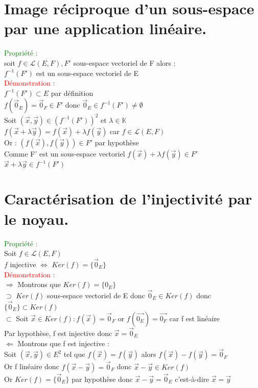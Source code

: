 \documentclass{article}
\begin{document}
\section{Image réciproque d'un sous-espace par une application linéaire.}
\textcolor{green}{Propriété :} \\ 
soit $f \in \mathcal{L}(E,F),F'$ sous-espace vectoriel de F alors : \\ 
$f^{-1}(F')$ est un sous-espace vectoriel de E \\ 
\textcolor{red}{Démonstration :} \\ 
$f^{-1}(F') \subset E$ par définition \\ 
$f(\vec{0}_E)=\vec{0}_F \in F'$ donc $\vec{0}_E \in f^{-1}(F')\neq \emptyset$ \\
Soit $(\vec{x}, \vec{y}) \in (f^{-1}(F'))^2$ et $ \lambda \in \mathbb{K}$ \\ 
$f(\vec{x} + \lambda \vec{y})= f(\vec{x}) +\lambda f(\vec{y})$ car $f \in \mathcal{L}(E,F)$ \\ 
Or : $(f(\vec{x}),f(\vec{y})) \in F'$ par hypothèse \\ 
Comme F' est un sous-espace vectoriel $f(\vec{x})+ \lambda f(\vec{y}) \in F'$ \\ 
$\vec{x}+ \lambda \vec{y} \in f^{-1}(F')$ 
\section{Caractérisation de l'injectivité par le noyau.}
\textcolor{green}{Propriété :} \\ 
Soit $f \in \mathcal{L}(E,F)$ \\ 
$f$ injective $\Longleftrightarrow$ $Ker(f)= \lbrace\vec{0}_E \rbrace$ \\ 
\textcolor{red}{Démonstration :} \\ 
$\Rightarrow$ Montrons que $Ker(f)= \lbrace 0_E \rbrace$ \\ 
$\supset$ $Ker (f)$ sous-espace vectoriel de E donc $\vec{0}_E \in Ker(f)$ donc $\lbrace \vec{0}_E \rbrace \subset Ker(f)$ \\ 
$\subset$ Soit $\vec{x} \in Ker(f) : f(\vec{x})=\vec{0}_F$ or $f(\vec{0_E})=\vec{0_F}$ car f est linéaire \\ 
Par hypothèse, f est injective donc $\vec{x}=\vec{0}_E$ \\ 
$\Leftarrow$ Montrons que f est injective : \\ 
Soit $(\vec{x},\vec{y}) \in E^2$ tel que $f(\vec{x})=f(\vec{y})$ alors $f(\vec{x})-f(\vec{y})=\vec{0}_F$ \\
Or f linéaire donc $f(\vec{x}-\vec{y})=\vec{0}_F$ donc $\vec{x} -\vec{y} \in Ker(f)$ \\ 
Or $Ker(f)= \lbrace \vec{0}_E \rbrace$ par hypothèse donc $\vec{x}- \vec{y}=\vec{0}_E$ c'est-à-dire $\vec{x}=\vec{y}$
\end{document}
